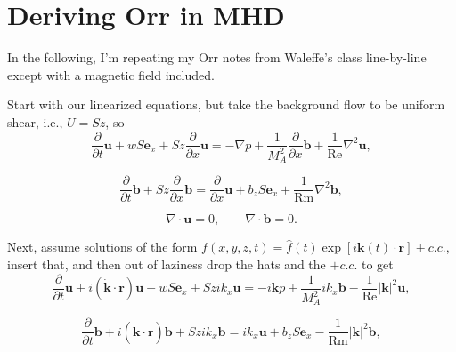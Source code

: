 \documentclass[aps,pop,preprint]{revtex4}
\begin{document}
% 
\section{Deriving Orr in MHD}
In the following, I'm repeating my Orr notes from Waleffe's class line-by-line except with a magnetic field included.

Start with our linearized equations, but take the background flow to be uniform shear, i.e., $U = Sz$, so
\begin{equation} \label{eq:lin-momentum}
\frac{\partial}{\partial t} \mathbf{u} + wS \mathbf{e}_x + Sz \frac{\partial}{\partial x}\mathbf{u} = - \nabla p + \frac{1}{M_A^2} \frac{\partial}{\partial x}\mathbf{b} + \frac{1}{\mathrm{Re}} \nabla^2 \mathbf{u},
\end{equation}

\begin{equation} \label{eq:lin-induction}
\frac{\partial}{\partial t} \mathbf{b} + Sz \frac{\partial}{\partial x}\mathbf{b} = \frac{\partial}{\partial x}\mathbf{u} + b_z S \mathbf{e}_x + \frac{1}{\mathrm{Rm}} \nabla^2 \mathbf{b},
\end{equation}

\begin{equation}
    \nabla \cdot \mathbf{u} = 0, \qquad \nabla \cdot \mathbf{b} = 0.
\end{equation}

Next, assume solutions of the form $f(x, y, z, t) = \hat{f}(t) \exp{[i \mathbf{k}(t) \cdot \mathbf{r}]} + c.c.$, insert that, and then out of laziness drop the hats and the $+ c.c.$ to get
\begin{equation} \label{eq:FT-momentum}
\frac{\partial}{\partial t} \mathbf{u} + i(\dot{\mathbf{k}} \cdot \mathbf{r}) \mathbf{u} + wS \mathbf{e}_x + Sz i k_x \mathbf{u} = - i \mathbf{k} p + \frac{1}{M_A^2} i k_x \mathbf{b} - \frac{1}{\mathrm{Re}} |\mathbf{k}|^2 \mathbf{u},
\end{equation}

\begin{equation} \label{eq:FT-induction}
\frac{\partial}{\partial t} \mathbf{b} + i(\dot{\mathbf{k}} \cdot \mathbf{r}) \mathbf{b} + Sz i k_x \mathbf{b} = i k_x \mathbf{u} + b_z S \mathbf{e}_x - \frac{1}{\mathrm{Rm}} |\mathbf{k}|^2 \mathbf{b},
\end{equation}
\end{document}
